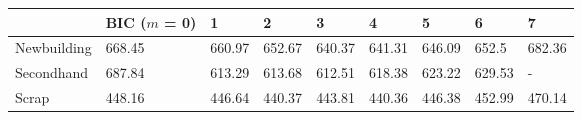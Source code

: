 
\begin{tabular}[t]{lllllllll}
\toprule
  & BIC ($m$ = 0) & 1 & 2 & 3 & 4 & 5 & 6 & 7\\
\midrule
Newbuilding & 668.45 & 660.97 & 652.67 & 640.37 & 641.31 & 646.09 & 652.5 & 682.36\\
Secondhand & 687.84 & 613.29 & 613.68 & 612.51 & 618.38 & 623.22 & 629.53 & -\\
Scrap & 448.16 & 446.64 & 440.37 & 443.81 & 440.36 & 446.38 & 452.99 & 470.14\\
\bottomrule
\end{tabular}
